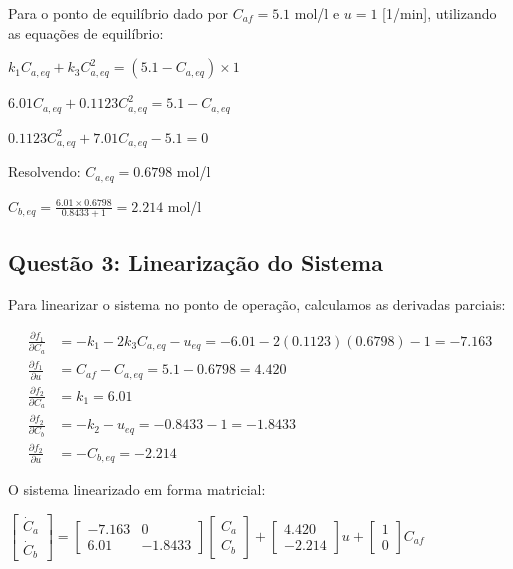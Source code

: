 \documentclass[a4paper,12pt]{article}
\begin{document}
Para o ponto de equilíbrio dado por $C_{af} = 5.1$ mol/l e $u = 1$ [1/min], utilizando as equações de equilíbrio:

$k_1 C_{a,eq} + k_3 C_{a,eq}^2 = (5.1 - C_{a,eq}) \times 1$

$6.01 C_{a,eq} + 0.1123 C_{a,eq}^2 = 5.1 - C_{a,eq}$

$0.1123 C_{a,eq}^2 + 7.01 C_{a,eq} - 5.1 = 0$

Resolvendo: $C_{a,eq} = 0.6798$ mol/l

$C_{b,eq} = \frac{6.01 \times 0.6798}{0.8433 + 1} = 2.214$ mol/l

\subsection{Questão 3: Linearização do Sistema}

Para linearizar o sistema no ponto de operação, calculamos as derivadas parciais:

\begin{align}
\frac{\partial f_1}{\partial C_a} &= -k_1 - 2k_3 C_{a,eq} - u_{eq} = -6.01 - 2(0.1123)(0.6798) - 1 = -7.163 \\
\frac{\partial f_1}{\partial u} &= C_{af} - C_{a,eq} = 5.1 - 0.6798 = 4.420 \\
\frac{\partial f_2}{\partial C_a} &= k_1 = 6.01 \\
\frac{\partial f_2}{\partial C_b} &= -k_2 - u_{eq} = -0.8433 - 1 = -1.8433 \\
\frac{\partial f_2}{\partial u} &= -C_{b,eq} = -2.214
\end{align}

O sistema linearizado em forma matricial:

$\begin{bmatrix} \dot{C}_a \\ \dot{C}_b \end{bmatrix} = \begin{bmatrix} -7.163 & 0 \\ 6.01 & -1.8433 \end{bmatrix} \begin{bmatrix} C_a \\ C_b \end{bmatrix} + \begin{bmatrix} 4.420 \\ -2.214 \end{bmatrix} u + \begin{bmatrix} 1 \\ 0 \end{bmatrix} C_{af}$
\end{document}
